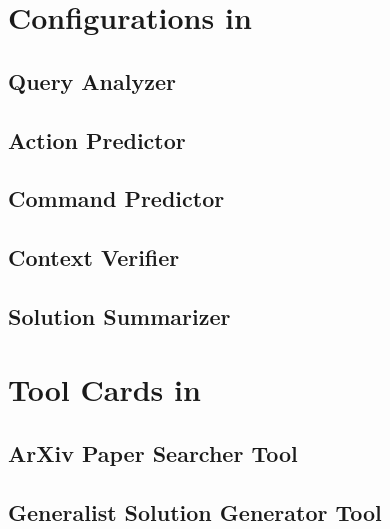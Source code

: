 \clearpage
\section{Configurations in \model}
\label{app:configuration}

\subsection{Query Analyzer}
\label{app:query_analysis}


\subsection{Action Predictor}
\label{app:action_prediction}


\subsection{Command Predictor}
\label{app:command_prediction}


\subsection{Context Verifier}
\label{app:verification}


\subsection{Solution Summarizer}
\label{app:solution_summarization}




\clearpage
\section{Tool Cards in \model}
\label{app:toolcards}

\subsection{ArXiv Paper Searcher Tool}
\label{app:arxiv_paper_searcher_tool}


\subsection{Generalist Solution Generator Tool}
\label{app:generalist_solution_generator_tool}


